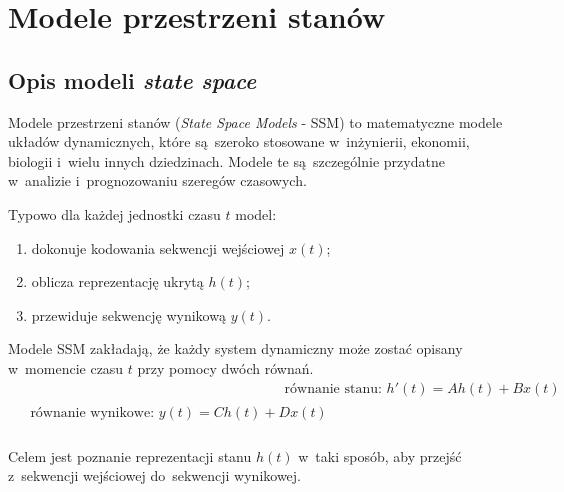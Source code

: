 \documentclass[data-science]{agh-wi} %
\begin{document}

\section{Modele przestrzeni stanów}
\subsection{Opis modeli \textit{state space}}
Modele przestrzeni stanów (\textit{State Space Models} - SSM) to matematyczne modele układów dynamicznych, które są~szeroko stosowane w~inżynierii, ekonomii, biologii i~wielu innych dziedzinach. Modele te są~szczególnie przydatne w~analizie i~prognozowaniu szeregów czasowych.

\noindent Typowo dla każdej jednostki czasu $t$ model:
\begin{enumerate}
    \item dokonuje kodowania sekwencji wejściowej $x(t)$;
    \item oblicza reprezentację ukrytą $h(t)$;
    \item przewiduje sekwencję wynikową $y(t)$.
\end{enumerate}

Modele SSM zakładają, że każdy system dynamiczny może zostać opisany w~momencie czasu $t$ przy pomocy dwóch równań.
\begin{align}
     & \text{równanie stanu: } h'(t) = Ah(t) + Bx(t) \label{equ:rownanie_stanu} \\
    \begin{split}
        &\text{równanie wynikowe: } y(t) = Ch(t) + Dx(t) \label{equ:rownanie_wynikowe} \\
    \end{split}
\end{align}

Celem jest poznanie reprezentacji stanu $h(t)$ w~taki sposób, aby przejść z~sekwencji wejściowej do~sekwencji wynikowej.
\end{document}
